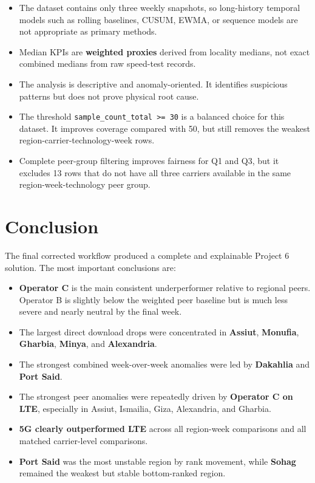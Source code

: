 \documentclass[12pt,a4paper]{article}
\begin{document}
\begin{itemize}
    \item The dataset contains only three weekly snapshots, so long-history temporal models such as rolling baselines, CUSUM, EWMA, or sequence models are not appropriate as primary methods.
    \item Median KPIs are \textbf{weighted proxies} derived from locality medians, not exact combined medians from raw speed-test records.
    \item The analysis is descriptive and anomaly-oriented. It identifies suspicious patterns but does not prove physical root cause.
    \item The threshold \texttt{sample\_count\_total >= 30} is a balanced choice for this dataset. It improves coverage compared with 50, but still removes the weakest region-carrier-technology-week rows.
    \item Complete peer-group filtering improves fairness for Q1 and Q3, but it excludes 13 rows that do not have all three carriers available in the same region-week-technology peer group.
\end{itemize}

\section{Conclusion}

The final corrected workflow produced a complete and explainable Project 6 solution. The most important conclusions are:

\begin{itemize}
    \item \textbf{Operator C} is the main consistent underperformer relative to regional peers. Operator B is slightly below the weighted peer baseline but is much less severe and nearly neutral by the final week.
    \item The largest direct download drops were concentrated in \textbf{Assiut}, \textbf{Monufia}, \textbf{Gharbia}, \textbf{Minya}, and \textbf{Alexandria}.
    \item The strongest combined week-over-week anomalies were led by \textbf{Dakahlia} and \textbf{Port Said}.
    \item The strongest peer anomalies were repeatedly driven by \textbf{Operator C on LTE}, especially in Assiut, Ismailia, Giza, Alexandria, and Gharbia.
    \item \textbf{5G clearly outperformed LTE} across all region-week comparisons and all matched carrier-level comparisons.
    \item \textbf{Port Said} was the most unstable region by rank movement, while \textbf{Sohag} remained the weakest but stable bottom-ranked region.
\end{itemize}
\end{document}
